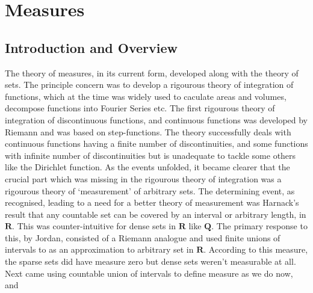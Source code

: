 \chapter{Measures} %

\label{Chapter2} %



\section{Introduction and Overview}
The theory of measures, in its current form, developed along with the theory of
sets.
The principle concern was to develop a rigourous theory of integration of
functions, which at the time was widely used to caculate areas and volumes,
decompose functions into Fourier Series etc.
\newline
The first rigourous theory of integration of discontinuous functions, and
continuous functions was developed by Riemann and was based on step-functions.
The theory successfully deals with continuous functions having a finite number
of discontinuities, and some functions with infinite number of discontinuities
but is unadequate to tackle some others like the Dirichlet function.
\newline
As the events unfolded, it became clearer that the crucial part which was
missing in the rigourous theory of integration was a rigourous theory of
`measurement' of arbitrary sets.
\newline
The determining event, as recognised, leading to a need for a better theory of
measurement was Harnack's result that any countable set can be covered by an
interval or arbitrary length, in $\bm{R}$. This was counter-intuitive for dense
sets in $\bm{R}$ like $\bm{Q}$.
\newline
The primary response to this, by Jordan, consisted of a Riemann analogue and
used finite unions of intervals to as an approximation to arbitrary set in
$\bm{R}$.
According to this measure, the sparse sets did have measure zero but dense sets
weren't measurable at all.
\newline
Next came using countable union of intervals to define measure as we do now, and
